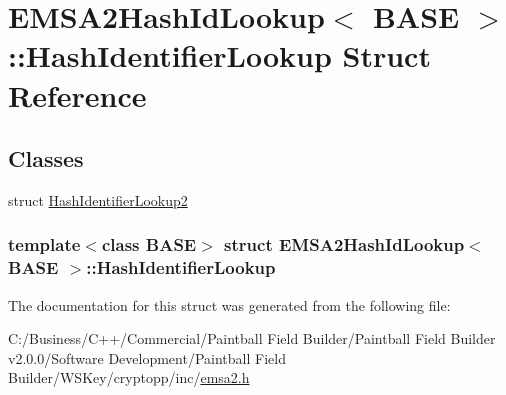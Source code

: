 \hypertarget{struct_e_m_s_a2_hash_id_lookup_1_1_hash_identifier_lookup}{
\section{EMSA2HashIdLookup$<$ BASE $>$::HashIdentifierLookup Struct Reference}
\label{struct_e_m_s_a2_hash_id_lookup_1_1_hash_identifier_lookup}
}
\subsection*{Classes}
\begin{DoxyCompactItemize}
\item 
struct \hyperlink{struct_e_m_s_a2_hash_id_lookup_1_1_hash_identifier_lookup_1_1_hash_identifier_lookup2}{HashIdentifierLookup2}
\end{DoxyCompactItemize}
\subsubsection*{template$<$class BASE$>$ struct EMSA2HashIdLookup$<$ BASE $>$::HashIdentifierLookup}



The documentation for this struct was generated from the following file:\begin{DoxyCompactItemize}
\item 
C:/Business/C++/Commercial/Paintball Field Builder/Paintball Field Builder v2.0.0/Software Development/Paintball Field Builder/WSKey/cryptopp/inc/\hyperlink{emsa2_8h}{emsa2.h}\end{DoxyCompactItemize}
